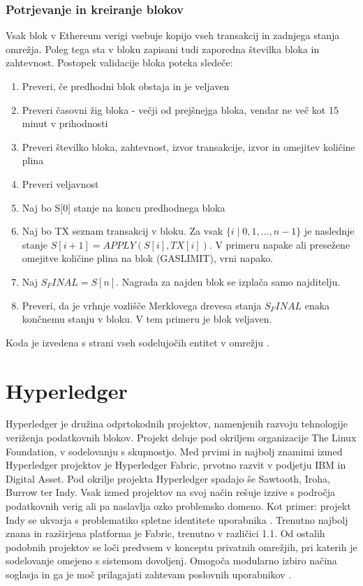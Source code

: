 \documentclass[a4paper, 12pt]{book}
\begin{document}
\subsubsection{Potrjevanje in kreiranje blokov}
Vsak blok v Ethereum verigi vsebuje kopijo vseh transakcij in zadnjega stanja omrežja.
Poleg tega sta v bloku zapisani tudi zaporedna številka bloka in zahtevnost.
Postopek validacije bloka poteka sledeče:
\begin{enumerate}
\item Preveri, če predhodni blok obstaja in je veljaven
\item Preveri časovni žig bloka - večji od prejšnejga bloka, vendar ne več kot 15 minut v prihodnosti
\item Preveri številko bloka, zahtevnost, izvor transakcije, izvor  in omejitev količine plina
\item Preveri veljavnost 
\item Naj bo S[0] stanje na koncu predhodnega bloka
\item Naj bo TX seznam transakcij v bloku. Za vsak 
$\{i \mid 0,1,\dots, n-1\}$
je naslednje stanje
 $S[i+1] = APPLY(S[i], TX[i])$.
V primeru napake ali presežene omejitve količine plina na blok (GASLIMIT), vrni napako.
\item Naj $S_FINAL = S[n]$. Nagrada za najden blok se izplača samo najditelju.
\item Preveri, da je vrhnje vozlišče Merklovega drevesa stanja $S_FINAL$ enaka končnemu stanju v bloku. V tem primeru je blok veljaven.
\end{enumerate}

Koda je izvedena s strani vseh sodelujočih entitet v omrežju \cite{ethereumWhitepaper}.

\section{Hyperledger}
Hyperledger je družina odprtokodnih projektov, namenjenih razvoju tehnologije veriženja podatkovnih blokov.
Projekt deluje pod okriljem organizacije The Linux Foundation, v sodelovanju s skupnostjo.
Med prvimi in najbolj znamimi izmed Hyperledger projektov je Hyperledger Fabric, prvotno razvit v podjetju IBM in Digital Asset.
Pod okrilje projekta Hyperledger spadajo še Sawtooth, Iroha, Burrow ter Indy.
Vsak izmed projektov na svoj način rešuje izzive s področja podatkovnih verig ali pa naslavlja ozko problemsko domeno. Kot primer: projekt Indy se ukvarja s problematiko spletne identitete uporabnika \cite{hyperledgerWeb}.
Trenutno najbolj znana in razširjena platforma je Fabric, trenutno v različici 1.1.
Od ostalih podobnih projektov se loči predvsem v konceptu privatnih omrežjih, pri katerih je sodelovanje omejeno s sistemom dovoljenj.
Omogoča modularno izbiro načina soglasja in ga je moč prilagajati zahtevam poslovnih uporabnikov \cite{hyperledgerIbm}.
\end{document}
